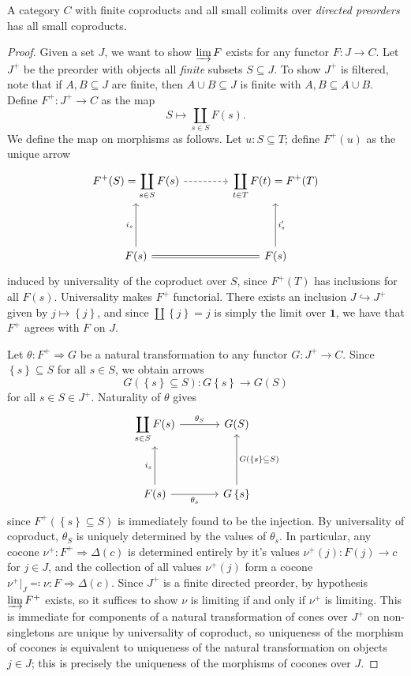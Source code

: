 \begin{theorem}\label{thm:9.1}
	A category $C$ with finite coproducts and all small colimits over \emph{directed preorders} has all small coproducts.
\end{theorem}
\begin{proof}
	Given a set $J$, we want to show $\varinjlim F$ exists for any functor $F : J \to C$. Let $J^+$ be the preorder with objects all \emph{finite} subsets $S\subseteq J$. To show $J^+$ is filtered, note that if $A,B\subseteq J$ are finite, then $A \cup B\subseteq J$ is finite with $A,B\subseteq A\cup B$. Define $F^+: J^+ \to C$ as the map
	\[
		S\mapsto \coprod_{s\in S} F(s)
	.\]
	We define the map on morphisms as follows. Let $u:S\subseteq T$; define $F^+(u)$ as the unique arrow
	\[\begin{tikzcd}[row sep = 4em, column sep = 4em]
		\displaystyle{F^+(S)=\coprod_{s\in S} F(s)}\ar[dashed, r]  & \displaystyle{\coprod_{t\in T} F(t)=F^+(T)} \\
	F(s)\ar[" i_s ", u] \ar[equals, r]  & F(s)\ar[" i'_s "', u] 
	\end{tikzcd}\]
	induced by universality of the coproduct over $S$, since $F^+(T)$ has inclusions for all $F(s)$. Universality makes $F^+$ functorial. There exists an inclusion $J\hookrightarrow J^+$ given by $j\mapsto \left\{ j \right\} $, and since $\coprod \left\{ j \right\} =j $ is simply the limit over $\mathbf{1} $, we have that $F^+$ agrees with $F$ on $J$.

	Let $\theta : F^+ \Rightarrow G$ be a natural transformation to any functor $G : J^+ \to C$. Since $\left\{ s \right\} \subseteq S$ for all $s\in S$, we obtain arrows
	\[
		G(\left\{ s \right\} \subseteq S): G\left\{ s \right\}  \to G(S)
	\]
	for all $s\in S\in J^+$. Naturality of $\theta$ gives
	\[\begin{tikzcd}[row sep = 3.5em, column sep = 3.5em]
		\displaystyle{\coprod_{s\in S} F(s)}\ar[" \theta_S ", r]  & G(S) \\
	F(s)\ar[" i_s ", u] \ar[" \theta_s "', r]  & G\left\{ s \right\} \ar[" G(\left\{ s \right\} \subseteq S) "', u] 
	\end{tikzcd}\]
	since $F^+(\left\{ s \right\} \subseteq S)$ is immediately found to be the injection. By universality of coproduct, $\theta_S$ is uniquely determined by the values of $\theta_s$. In particular, any cocone $\nu^+ : F^+ \Rightarrow \Delta(c)$ is determined entirely by it's values $\nu^+(j) : F(j) \to c$ for $j\in J$, and the collection of all values $\nu^+(j)$ form a cocone $\nu^+|_J \eqqcolon \nu : F \Rightarrow \Delta(c)$. Since $J^+$ is a finite directed preorder, by hypothesis $\varinjlim F^+$ exists, so it suffices to show $\nu$ is limiting if and only if $\nu^+$ is limiting. This is immediate for components of a natural transformation of cones over $J^+$ on non-singletons are unique by universality of coproduct, so uniqueness of the morphism of cocones is equivalent to uniqueness of the natural transformation on objects $j\in J$; this is precisely the uniqueness of the morphisms of cocones over $J$.
\end{proof}

